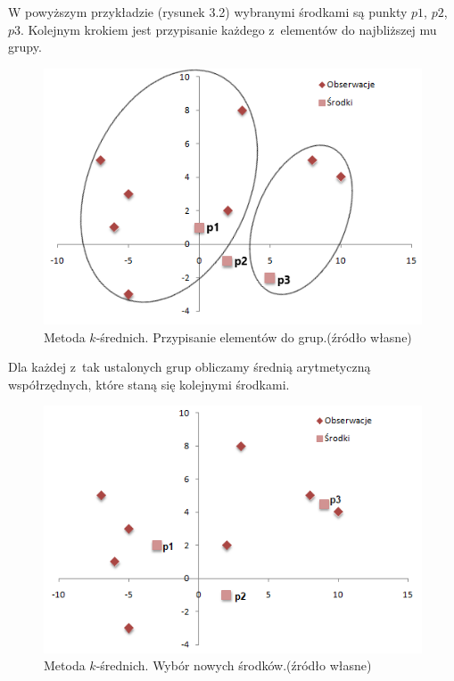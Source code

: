 \documentclass[12pt,a4paper]{report}
\begin{document}
W powyższym przykładzie (rysunek 3.2) wybranymi środkami są punkty $p1$, $p2$, $p3$. Kolejnym krokiem jest przypisanie każdego z~elementów do najbliższej mu grupy.
\begin{center}
\begin{figure}[H]
\centering
\includegraphics[scale=0.8]{obrazy/ks_1.png} 
\caption{Metoda $k$-średnich. Przypisanie elementów do grup.(źródło własne)}
\end{figure}
\end{center}
Dla każdej z~tak ustalonych grup obliczamy średnią arytmetyczną współrzędnych, które staną się kolejnymi środkami.
\begin{center}
\begin{figure}[H]
\centering
\includegraphics[scale=0.8]{obrazy/ks_2.png} 
\caption{Metoda $k$-średnich. Wybór nowych środków.(źródło własne)}
\end{figure}
\end{center}
\end{document}
